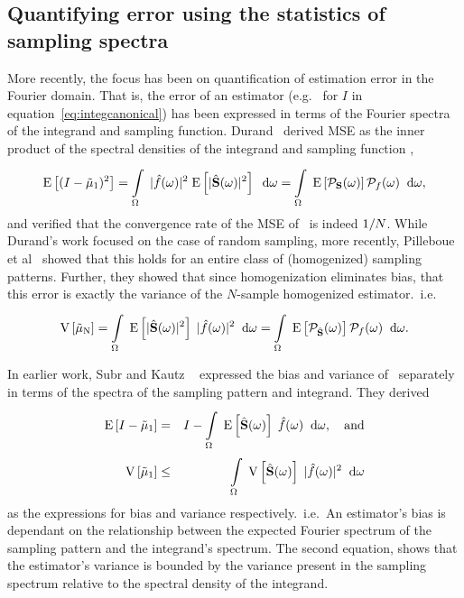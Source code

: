 \subsection{Quantifying error using the statistics of sampling spectra}
More recently, the focus has been on quantification of estimation error in the Fourier domain. That is, the error of an estimator (e.g.~ for $I$ in equation~\ref{eq:integcanonical}) has been expressed in terms of the Fourier spectra of the integrand and sampling function. 
Durand~\cite{FredoTR} derived MSE as the inner product of the spectral densities of the integrand and sampling function
, 
\begin{equation} \label{eq:durand11}
   \mathrm{E} \left[(I-\tilde\mu_\mathrm{1})^2 \right] = \displaystyle\int\limits_{\Omega}^{} \; |\hat{f}(\omega)|^2 \; \mathrm{E} \left[|\hat{\mathbf{S}}(\omega)|^2 \right] \;\; \mathrm{d}\omega = \displaystyle\int\limits_{\Omega}^{} \; \mathrm{E} \left[\mathcal{P}_{\mathbf{S}}(\omega) \right] \mathcal{P}_{f}(\omega) \;\; \mathrm{d}\omega ,
\end{equation}
and verified that the convergence rate of the MSE of \estim{\N}\ is indeed $1/N$. While Durand's work focused on the case of random sampling, more recently, Pilleboue et al~\cite{Pilleboue:2015:VAM} showed that this holds for an entire class of (homogenized) sampling patterns. Further, they showed that since homogenization eliminates bias, that this error is exactly the variance of the $N$-sample homogenized estimator.~i.e.
\begin{equation} \label{eq:pillebouevar}
\mathrm{V} \left[\tilde\mu_\mathrm{N}\right] 
= \displaystyle\int\limits_{\Omega}^{} \; \mathrm{E} \left[|\hat{\mathbf{S}}(\omega)|^2 \right]\;|\hat{f}(\omega)|^2 \;\; \mathrm{d}\omega 
= \displaystyle\int\limits_{\Omega}^{} \; \mathrm{E} \left[\mathcal{P}_{\hat{\mathbf{S}}}(\omega) \right] \mathcal{P}_{f}(\omega) \;\; \mathrm{d}\omega. 
\end{equation}

In earlier work, Subr and Kautz ~\cite{Subr:2013:FAS} expressed the bias and variance of \ separately in terms of the spectra of the sampling pattern and integrand. They derived
\begin{eqnarray}
  \mathrm{E} \left[I-\tilde\mu_\mathrm{1} \right] &=& I - \displaystyle\int\limits_{\Omega}^{} \; \mathrm{E} \left[\hat{\mathbf{S}}(\omega) \right] \; \hat{f}(\omega)  \;\; \mathrm{d}\omega, \quad \mathrm{and} \\
    \mathrm{V} \left[\tilde\mu_\mathrm{1}\right] &\leq& \displaystyle\int\limits_{\Omega}^{} \; \mathrm{V} \left[\hat{\mathbf{S}}(\omega)\right] \; |\hat{f}(\omega)|^2 \;\; \mathrm{d}\omega
\end{eqnarray}
as the expressions for bias and variance respectively.~i.e.~An estimator's bias is dependant on the relationship between the expected Fourier spectrum of the sampling pattern and the integrand's spectrum. The second equation, shows that the estimator's variance is bounded by the variance present in the sampling spectrum relative to the spectral density of the integrand. 

